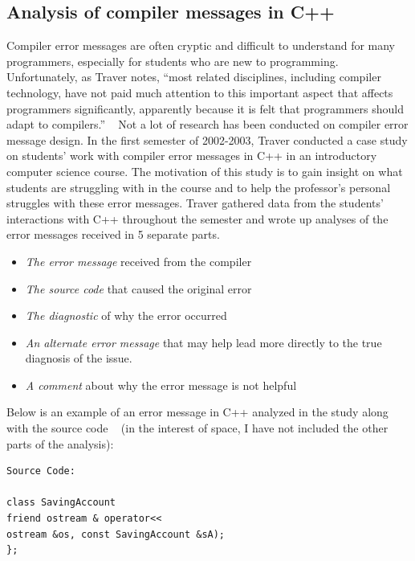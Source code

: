 \documentclass{sig-alternate}
\begin{document}
\subsection{Analysis of compiler messages in C++}\label{subsec:compiler analysis}


Compiler error messages are often cryptic and difficult to understand for many programmers, especially for students who are new to programming.
Unfortunately, as Traver notes, ``most related disciplines, including compiler technology, have not paid much attention to this important aspect that affects programmers significantly, apparently because it is felt that programmers should adapt to compilers.'' ~\cite{Traver:2010}
Not a lot of research has been conducted on compiler error message design.
In the first semester of 2002-2003, Traver conducted a case study on students' work with compiler error messages in C++ in an introductory computer science course.
The motivation of this study is to gain insight on what students are struggling with in the course and to help the professor's personal struggles with these error messages.
Traver gathered data from the students' interactions with C++ throughout the semester and wrote up analyses of the error messages received in 5 separate parts.
\begin{itemize}
	\item \textit{The error message} received from the compiler
	\item \textit{The source code} that caused the original error
	\item \textit{The diagnostic} of why the error occurred
	\item \textit{An alternate error message} that may help lead more directly to the true diagnosis of the issue.
	\item \textit{A comment} about why the error message is not helpful
\end{itemize}

Below is an example of an error message in C++ analyzed in the study along with the source code ~\cite{Traver:2010} (in the interest of space, I have not included the other parts of the analysis):

\begin{verbatim}
Source Code:

class SavingAccount 
friend ostream & operator<<
ostream &os, const SavingAccount &sA);
};
\end{verbatim}
\end{document}
